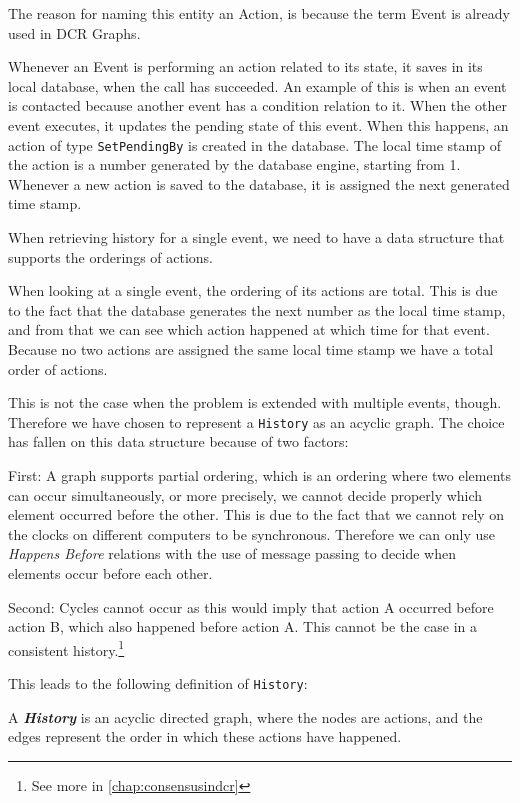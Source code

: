 	The reason for naming this entity an Action, is because the term Event is already used in DCR Graphs.
	
	Whenever an Event is performing an action related to its state, it saves in its local database, when the call has succeeded. An example of this is when an event is contacted because another event has a condition relation to it. When the other event executes, it updates the pending state of this event. When this happens, an action of type \texttt{SetPendingBy} is created in the database. The local time stamp of the action is a number generated by the database engine, starting from 1. Whenever a new action is saved to the database, it is assigned the next generated time stamp.
	
	When retrieving history for a single event, we need to have a data structure that supports the orderings of actions.
	
	\newpar When looking at a single event, the ordering of its actions are total. This is due to the fact that the database generates the next number as the local time stamp, and from that we can see which action happened at which time for that event.
	Because no two actions are assigned the same local time stamp we have a total order of actions.
	
	\newpar This is not the case when the problem is extended with multiple events, though. Therefore we have chosen to represent a \texttt{History} as an acyclic graph. The choice has fallen on this data structure because of two factors:
	
	First: A graph supports partial ordering, which is an ordering where two elements can occur simultaneously, or more precisely, we cannot decide properly which element occurred before the other. This is due to the fact that we cannot rely on the clocks on different computers to be synchronous. Therefore we can only use \textit{Happens Before} relations with the use of message passing to decide when elements occur before each other.
	
	Second: Cycles cannot occur as this would imply that action A occurred before action B, which also happened before action A. This cannot be the case in a consistent history.\footnote{See more in \autoref{chap:consensusindcr}}
	
	\newpar This leads to the following definition of \texttt{History}:
	
	\newpar
	\begin{definition}
		A \textit{\textbf{History}} is an acyclic directed graph, where the nodes are actions, and the edges represent the order in which these actions have happened.
	\end{definition}
	
